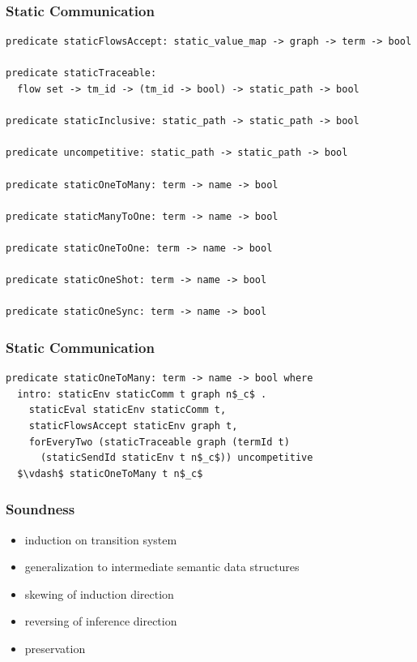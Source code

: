 \documentclass{beamer}
\begin{document}
\begin{frame}[fragile]
	\frametitle{Static Communication}
\begin{lstlisting}[language=logic, mathescape]
predicate staticFlowsAccept: static_value_map -> graph -> term -> bool

predicate staticTraceable:
  flow set -> tm_id -> (tm_id -> bool) -> static_path -> bool

predicate staticInclusive: static_path -> static_path -> bool

predicate uncompetitive: static_path -> static_path -> bool

predicate staticOneToMany: term -> name -> bool

predicate staticManyToOne: term -> name -> bool

predicate staticOneToOne: term -> name -> bool

predicate staticOneShot: term -> name -> bool

predicate staticOneSync: term -> name -> bool
\end{lstlisting}
\end{frame}

\begin{frame}[fragile]
	\frametitle{Static Communication}
\begin{lstlisting}[language=logic, mathescape]
predicate staticOneToMany: term -> name -> bool where
  intro: staticEnv staticComm t graph n$_c$ .
    staticEval staticEnv staticComm t,
    staticFlowsAccept staticEnv graph t,
    forEveryTwo (staticTraceable graph (termId t)
      (staticSendId staticEnv t n$_c$)) uncompetitive
  $\vdash$ staticOneToMany t n$_c$
\end{lstlisting}
\end{frame}


\begin{frame}
\frametitle{Soundness}
\begin{itemize}
\item induction on transition system 
\item generalization to intermediate semantic data structures 
\item skewing of induction direction
\item reversing of inference direction  
\item preservation
\end{itemize}
\end{frame}
\end{document}
